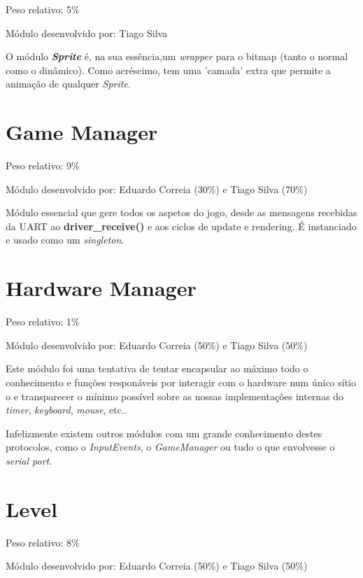 \documentclass{report}
\begin{document}
Peso relativo: 5\%

Módulo desenvolvido por: Tiago Silva
\newline

O módulo \textbf{\textit{Sprite}} é, na sua essência,um \textit{wrapper} para o bitmap (tanto o normal como o dinâmico). Como acréscimo, tem uma 'camada' extra que permite a animação de qualquer \textit{Sprite}.

\section{Game Manager}

Peso relativo: 9\%

Módulo desenvolvido por: Eduardo Correia (30\%) e Tiago Silva (70\%)
\newline

Módulo essencial que gere todos os aspetos do jogo, desde as mensagens recebidas da UART ao \textbf{driver\_receive()} e aos ciclos de update e rendering. É instanciado e usado como um \textit{singleton}.

\section{Hardware Manager}

Peso relativo: 1\%

Módulo desenvolvido por: Eduardo Correia (50\%) e Tiago Silva (50\%)
\newline

Este módulo foi uma tentativa de tentar encapsular ao máximo todo o conhecimento e funções responáveis por interagir com o hardware num único sítio o e transparecer o mínimo possível sobre as nossas implementações internas do \textit{timer}, \textit{keyboard}, \textit{mouse}, etc..

Infelizmente existem outros módulos com um grande conhecimento destes protocolos, como o \textit{InputEvents}, o \textit{GameManager} ou tudo o que envolvesse o \textit{serial port}.\newline

\section{Level}

Peso relativo: 8\%

Módulo desenvolvido por: Eduardo Correia (50\%) e Tiago Silva (50\%) 
\newline
\end{document}
